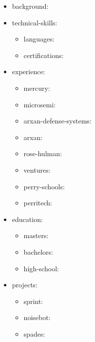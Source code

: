 \iffalse
{}
\begin{cvparagraph}
\begin{itemize}[leftmargin=2ex, nosep, noitemsep]
\item background: 
\item technical-skills: 
    \begin{itemize}[leftmargin=2ex, nosep, noitemsep]
    \item languages: 
    \item certifications: 
    \end{itemize}
\item experience: 
    \begin{itemize}[leftmargin=2ex, nosep, noitemsep]
    \item mercury: 
    \item microsemi: 
    \item arxan-defense-systems: 
    \item arxan: 
    \item rose-hulman: 
    \item ventures: 
    \item perry-schools: 
    \item perritech: 
    \end{itemize}
\item education: 
    \begin{itemize}[leftmargin=2ex, nosep, noitemsep]
    \item masters: 
    \item bachelors: 
    \item high-school: 
    \end{itemize}
\item projects: 
    \begin{itemize}[leftmargin=2ex, nosep, noitemsep]
    \item sprint: 
    \item noisebot: 
    \item spades: 

\end{itemize}
\end{itemize}
\end{cvparagraph}
